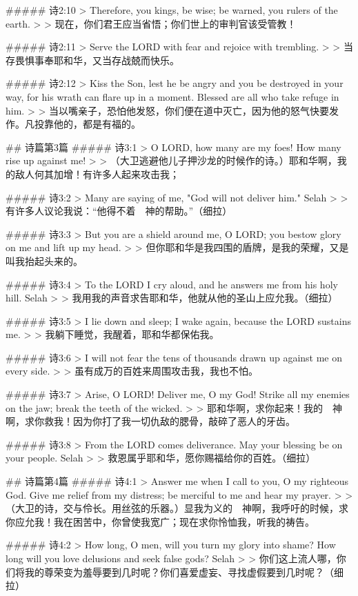 ##### 诗2:10
> Therefore, you kings, be wise; be warned, you rulers of the earth.
>
> 现在，你们君王应当省悟；你们世上的审判官该受管教！


##### 诗2:11
> Serve the LORD with fear and rejoice with trembling.
>
> 当存畏惧事奉耶和华，又当存战兢而快乐。


##### 诗2:12
> Kiss the Son, lest he be angry and you be destroyed in your way, for his wrath can flare up in a moment. Blessed are all who take refuge in him.
>
> 当以嘴亲子，恐怕他发怒，你们便在道中灭亡，因为他的怒气快要发作。凡投靠他的，都是有福的。


## 诗篇第3篇
##### 诗3:1
> O LORD, how many are my foes! How many rise up against me!
>
> （大卫逃避他儿子押沙龙的时候作的诗。）耶和华啊，我的敌人何其加增！有许多人起来攻击我；


##### 诗3:2
> Many are saying of me, "God will not deliver him." Selah
>
> 有许多人议论我说：“他得不着　神的帮助。”（细拉）


##### 诗3:3
> But you are a shield around me, O LORD; you bestow glory on me and lift up my head.
>
> 但你耶和华是我四围的盾牌，是我的荣耀，又是叫我抬起头来的。


##### 诗3:4
> To the LORD I cry aloud, and he answers me from his holy hill. Selah
>
> 我用我的声音求告耶和华，他就从他的圣山上应允我。（细拉）


##### 诗3:5
> I lie down and sleep; I wake again, because the LORD sustains me.
>
> 我躺下睡觉，我醒着，耶和华都保佑我。


##### 诗3:6
> I will not fear the tens of thousands drawn up against me on every side.
>
> 虽有成万的百姓来周围攻击我，我也不怕。


##### 诗3:7
> Arise, O LORD! Deliver me, O my God! Strike all my enemies on the jaw; break the teeth of the wicked.
>
> 耶和华啊，求你起来！我的　神啊，求你救我！因为你打了我一切仇敌的腮骨，敲碎了恶人的牙齿。


##### 诗3:8
> From the LORD comes deliverance. May your blessing be on your people. Selah
>
> 救恩属乎耶和华，愿你赐福给你的百姓。（细拉）


## 诗篇第4篇
##### 诗4:1
> Answer me when I call to you, O my righteous God. Give me relief from my distress; be merciful to me and hear my prayer.
>
> （大卫的诗，交与伶长。用丝弦的乐器。）显我为义的　神啊，我呼吁的时候，求你应允我！我在困苦中，你曾使我宽广；现在求你怜恤我，听我的祷告。


##### 诗4:2
> How long, O men, will you turn my glory into shame? How long will you love delusions and seek false gods? Selah
>
> 你们这上流人哪，你们将我的尊荣变为羞辱要到几时呢？你们喜爱虚妄、寻找虚假要到几时呢？（细拉）


